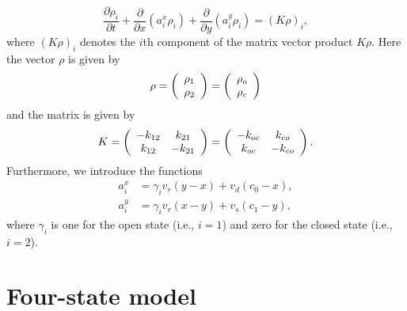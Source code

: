 \[
\frac{\partial\rho_{i}}{\partial t}+\frac{\partial}{\partial x}\left(
a_{i}^{x}\rho_{i}\right)  +\frac{\partial}{\partial y}\left(  a_{i}^{y}%
\rho_{i}\right)  =\left(  K\rho\right)  _{i},
\]
where $\left(  K\rho\right)  _{i}$ denotes the $i$th component of the matrix
vector product $K\rho.$ Here the vector $\rho$ is given by%
\[
\rho=\left(
\begin{array}
[c]{c}%
\rho_{1}\\
\rho_{2}%
\end{array}
\right)  =\left(
\begin{array}
[c]{c}%
\rho_{o}\\
\rho_{c}%
\end{array}
\right)  
\]
and the matrix is given by%
\[
K=\left(
\begin{array}
[c]{cc}%
-k_{12} & k_{21}\\
k_{12} & -k_{21}%
\end{array}
\right) =\left(
\begin{array}
[c]{cc}%
-k_{oc} & k_{co}\\
k_{oc} & -k_{co}%
\end{array}
\right) .
\]
Furthermore, we introduce the functions%
\begin{align*}
a_{i}^{x}  &  =\gamma_{i}v_{r}\left(  y-x\right)  +v_{d}\left(  c_{0}%
-x\right)  ,\\
a_{i}^{y}  &  =\gamma_{i}v_{r}\left(  x-y\right)  +v_{s}\left(  c_{1}%
-y\right)  ,
\end{align*}
where $\gamma_{i}$ is one for the open state (i.e., $i=1$) and zero for the closed
state (i.e., $i=2$).
\bigskip

\section{Four-state model}

